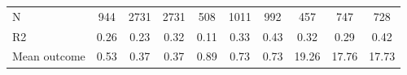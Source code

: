 \begin{tabular}{lccc|ccc|ccc}
N           &         944         &        2731         &        2731         &         508         &        1011         &         992         &         457         &         747         &         728         \\
R2          &        0.26         &        0.23         &        0.32         &        0.11         &        0.33         &        0.43         &        0.32         &        0.29         &        0.42         \\
Mean outcome&        0.53         &        0.37         &        0.37         &        0.89         &        0.73         &        0.73         &       19.26         &       17.76         &       17.73         \\
\bottomrule \end{tabular}

